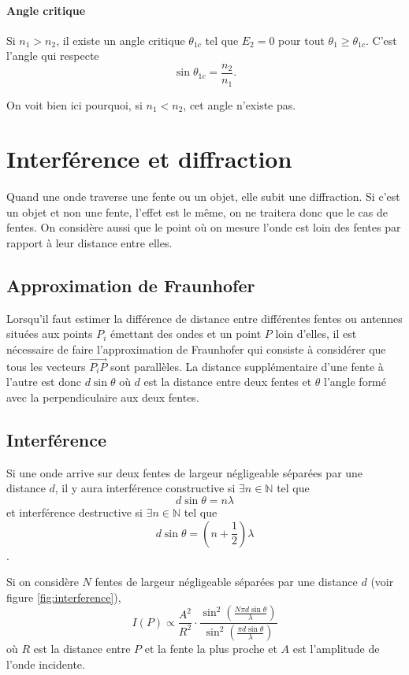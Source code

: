 \paragraph{Angle critique}
Si $n_1 > n_2$, il existe un angle critique $\theta_{1c}$ tel que
$E_{2} = 0$ pour tout $\theta_1 \geq \theta_{1c}$.
C'est l'angle qui respecte
\[ \sin\theta_{1c} = \frac{n_2}{n_1}. \]

On voit bien ici pourquoi, si $n_1 < n_2$, cet angle n'existe pas.

\section{Interférence et diffraction}
Quand une onde traverse une fente ou un objet, elle subit une diffraction.
Si c'est un objet et non une fente, l'effet est le même,
on ne traitera donc que le cas de fentes.
On considère aussi que le point où on mesure l'onde est loin des fentes
par rapport à leur distance entre elles.

\subsection{Approximation de Fraunhofer}
\label{sec:fraunhofer}
Lorsqu'il faut estimer la différence de distance entre différentes
fentes ou antennes situées aux points $P_i$ émettant des ondes
et un point $P$ loin d'elles,
il est nécessaire de faire l'approximation de Fraunhofer qui
consiste à considérer que tous les vecteurs $\vec{P_iP}$
sont parallèles.
La distance supplémentaire d'une fente à l'autre est donc $d\sin\theta$
où $d$ est la distance entre deux fentes et $\theta$ l'angle
formé avec la perpendiculaire aux deux fentes.

\subsection{Interférence}
Si une onde arrive sur deux fentes de largeur négligeable séparées par
une distance $d$,
il y aura interférence constructive si $\exists n \in \mathbb{N}$ tel que
\[ d\sin\theta = n \lambda \]
et interférence destructive si $\exists n \in \mathbb{N}$ tel que
\[ d\sin\theta = \left(n+\frac{1}{2}\right) \lambda \].

Si on considère $N$ fentes de largeur négligeable séparées par une
distance $d$ (voir figure \ref{fig:interference}),
\[ I(P) \propto \frac{A^2}{R^2} \cdot
  \frac{\sin^2\left(\frac{N \pi d \sin\theta}{\lambda}\right)}
{\sin^2\left(\frac{\pi d \sin\theta}{\lambda}\right)} \]
où $R$ est la distance entre $P$ et la fente la plus proche
et $A$ est l'amplitude de l'onde incidente.

